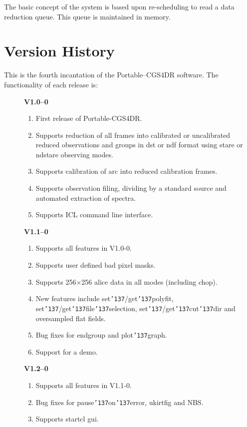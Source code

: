 \documentclass[a4paper]{book}
\renewcommand{\_}{{\tt\char'137}}
\begin{document}
The basic concept of the system is based upon re-scheduling to read a 
data reduction queue.  This queue is maintained in memory.

\section{Version History}
This is the fourth incantation of the Portable--CGS4DR software. The
functionality of each release is:

\begin{description}
\item[] {\bf V1.0--0}
 \begin{enumerate}
  \item First release of Portable-CGS4DR.
  \item Supports reduction of all frames into calibrated or uncalibrated reduced 
        observations and groups in {\sc dst} or {\sc ndf} format using {\sc stare} 
        or {\sc ndstare} observing modes.
  \item Supports calibration of {\sc arc} into reduced calibration frames.
  \item Supports observation filing, dividing by a standard source and automated
        extraction of spectra.
  \item Supports ICL command line interface.
 \end{enumerate}
\item[] {\bf V1.1--0}
 \begin{enumerate}
  \item Supports all features in V1.0-0.
  \item Supports user defined bad pixel masks.
  \item Supports 256$\times$256 {\sc alice} data in all modes (including {\sc chop}).
  \item New features include set\_/get\_polyfit, set\_/get\_file\_selection, set\_/get\_cut\_dir
        and oversampled {\sc flat} fields.
  \item Bug fixes for endgroup and plot\_graph.
  \item Support for a demo.
 \end{enumerate}
\item[] {\bf V1.2--0}
 \begin{enumerate}
  \item Supports all features in V1.1-0.
  \item Bug fixes for pause\_on\_error, ukirtfig and NBS.
  \item Supports {\sc startcl} {\sc gui}.

\end{enumerate}
\end{description}
\end{document}
